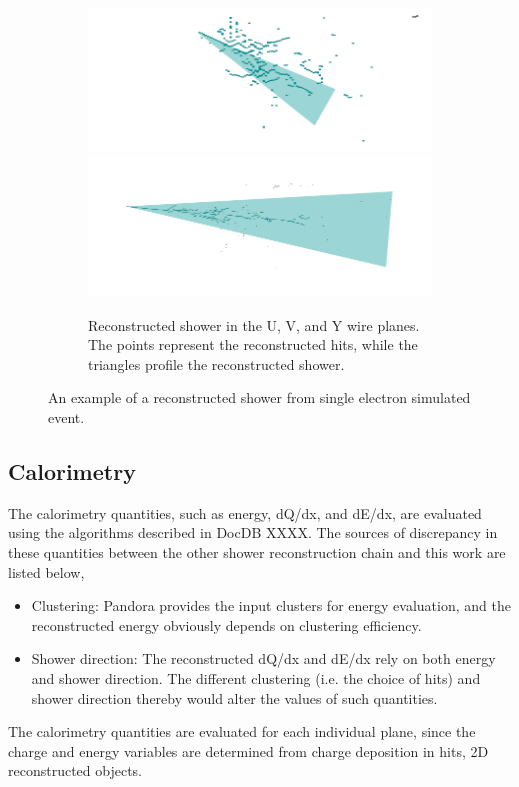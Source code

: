 \begin{figure}[htbp]
\begin{center}
\begin{subfigure}{0.45\textwidth}
\includegraphics[width=0.85\linewidth]{figs/reco/single_e_Evt1V.png}\\
\includegraphics[width=0.85\linewidth]{figs/reco/single_e_Evt1Y.png}
\caption{Reconstructed shower in the U, V, and Y wire planes.
The points represent the reconstructed hits, while the triangles
profile the reconstructed shower.}
\label{fig:shr_reco_example_2d}
\end{subfigure}
\caption{An example of a reconstructed shower from single electron
simulated event.}
\label{fig:shr_reco_example}
\end{center}
\end{figure}

\subsection{Calorimetry}
\label{sec:shr_calorimetry}

The calorimetry quantities, such as energy, dQ/dx, and dE/dx, are
evaluated using the algorithms described in DocDB XXXX.
The sources of discrepancy in these quantities between the other
shower reconstruction chain and this work are listed below,
\begin{itemize}
\item Clustering: Pandora provides the input clusters for energy
      evaluation, and the reconstructed energy obviously depends
      on clustering efficiency.
\item Shower direction: The reconstructed dQ/dx and dE/dx rely on
      both energy and shower direction.  
      The different clustering (i.e. the  choice of hits) and 
      shower direction thereby would alter the values of such
      quantities.
\end{itemize}

The calorimetry quantities are evaluated for each individual plane,
since the charge and energy variables are determined from charge
deposition in hits, 2D reconstructed objects.

